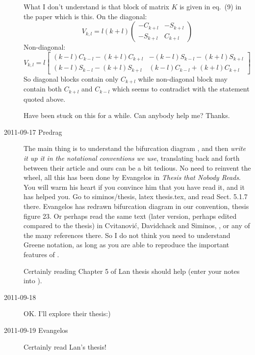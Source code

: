 \begin{description}
What I don't understand is that block of matrix $K$ is given in eq.~(9) in
the paper which is this. On the diagonal:
\[
V_{k,l}
=
l(k+l)
\left(
\begin{array}{cc}
-C_{k+l}   &  -S_{k+l}\\
-S_{k+l}   &   C_{k+l}
\end{array}
\right)
\]
Non-diagonal:
\[
V_{k,l}
=
l
\left[
\begin{array}{cc}
(k-l)C_{k-l}-(k+l)C_{k+l}   &  -(k-l)S_{k-l}-(k+l)S_{k+l}\\
(k-l)S_{k-l}-(k+l)S_{k+l}   &   (k-l)C_{k-l}+(k+l)C_{k+l}
\end{array}
\right]
\]
So diagonal blocks contain only $C_{k+l}$ while non-diagonal block may
contain both $C_{k+l}$ and $C_{k-l}$ which seems to contradict with the
statement quoted above.

Have been stuck on this for a while. Can anybody help me? Thanks.


\item[2011-09-17 Predrag] The main thing is to understand the bifurcation
diagram , and then \emph{write it up it in the
notational conventions we use}, translating back and forth between their
article and ours can be a bit tedious. No need to reinvent the wheel, all
this has been done by Evangelos in
\emph{
           {Thesis that Nobody Reads}}.
You will warm his heart if you convince him that you have read it, and it
has helped you. Go to siminos/thesis, latex thesis.tex, and read Sect.
5.1.7 there. Evangelos has redrawn bifurcation diagram
 in our convention, thesis figure 23. Or perhaps
read the same text (later version, perhaps edited compared to the thesis)
in Cvitanovi{\'c}, Davidchack and Siminos, ,
or any of the many references there. So I do not think you need to
understand Greene notation, as long as you are able to reproduce the
important features of .

Certainly reading Chapter 5 of  Lan thesis
should help (enter your notes into ).

\item[2011-09-18] OK. I'll explore their thesis:)

\item[2011-09-19 Evangelos] Certainly read Lan's thesis!

\end{description}

